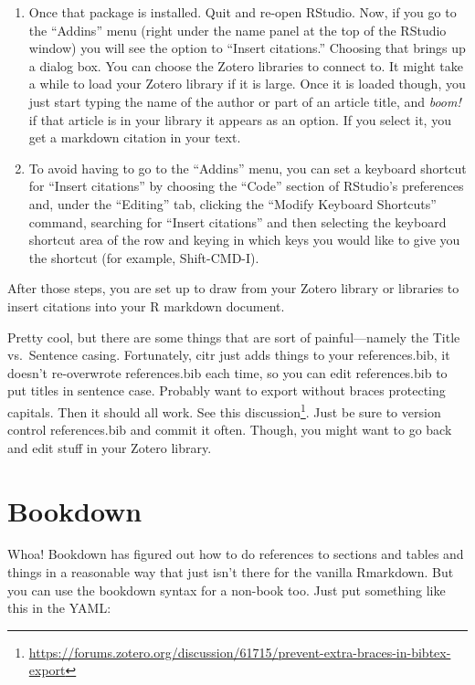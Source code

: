 \documentclass[]{krantz}
\renewcommand{\href}[2]{#2\footnote{\url{#1}}}
\begin{document}
\begin{enumerate}
  For more information about this package check out \url{https://github.com/crsh/citr}.
\item
  Once that package is installed. Quit and re-open RStudio. Now, if you go to the
  ``Addins'' menu (right under the name panel at the top of the RStudio window) you will
  see the option to ``Insert citations.'' Choosing that brings up a dialog box. You can choose
  the Zotero libraries to connect to. It might take a while to load your Zotero library if it
  is large. Once it is loaded though, you just start typing the name of the author or part
  of an article title, and \emph{boom!} if that article is in your library it appears as an option.
  If you select it, you get a markdown citation in your text.
\item
  To avoid having to go to the ``Addins'' menu, you can set a keyboard shortcut for
  ``Insert citations'' by choosing the ``Code'' section of RStudio's preferences and, under the
  ``Editing'' tab, clicking the ``Modify Keyboard Shortcuts'' command, searching for
  ``Insert citations'' and then selecting the keyboard shortcut area of the row and
  keying in which keys you would like to give you the shortcut (for example,
  Shift-CMD-I).
\end{enumerate}

After those steps, you are set up to draw from your Zotero library or libraries
to insert citations into your R markdown document.

Pretty cool, but there are some things that are sort of painful---namely
the Title vs.~Sentence casing. Fortunately, citr just adds things to your references.bib, it doesn't re-overwrote references.bib each time,
so you can edit references.bib to put titles in sentence case. Probably want to export without braces protecting capitals. Then it should all work. See \href{https://forums.zotero.org/discussion/61715/prevent-extra-braces-in-bibtex-export}{this discussion}. Just be sure to version control references.bib and commit it often. Though, you might want to go back and edit stuff in your Zotero library.

\citep{BarsonSexdependentdominancesingle2015}

\hypertarget{bookdown}{%
\section{Bookdown}\label{bookdown}}

Whoa! Bookdown has figured out how to do references to sections and tables and things in a reasonable
way that just isn't there for the vanilla Rmarkdown. But you can use the bookdown syntax for a non-book
too. Just put something like this in the YAML:
\end{document}
